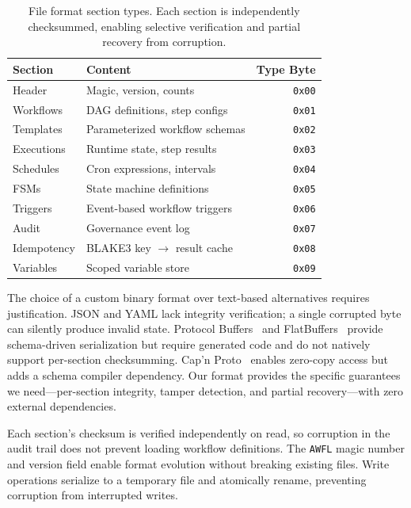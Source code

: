 \documentclass[10pt, twocolumn]{article}
\begin{document}
\begin{table}[t]
\caption{File format section types. Each section is independently checksummed, enabling selective verification and partial recovery from corruption.}
\label{tab:sections}
\centering\scriptsize
\begin{tabular}{@{}llr@{}}
\toprule
\textbf{Section} & \textbf{Content} & \textbf{Type Byte} \\
\midrule
Header      & Magic, version, counts        & \texttt{0x00} \\
Workflows   & DAG definitions, step configs  & \texttt{0x01} \\
Templates   & Parameterized workflow schemas & \texttt{0x02} \\
Executions  & Runtime state, step results    & \texttt{0x03} \\
Schedules   & Cron expressions, intervals    & \texttt{0x04} \\
FSMs        & State machine definitions      & \texttt{0x05} \\
Triggers    & Event-based workflow triggers   & \texttt{0x06} \\
Audit       & Governance event log           & \texttt{0x07} \\
Idempotency & BLAKE3 key $\to$ result cache  & \texttt{0x08} \\
Variables   & Scoped variable store          & \texttt{0x09} \\
\bottomrule
\end{tabular}
\end{table}

The choice of a custom binary format over text-based alternatives requires justification. JSON and YAML lack integrity verification; a single corrupted byte can silently produce invalid state. Protocol Buffers~\cite{protobuf2008} and FlatBuffers~\cite{flatbuffers2014} provide schema-driven serialization but require generated code and do not natively support per-section checksumming. Cap'n Proto~\cite{capnproto2013} enables zero-copy access but adds a schema compiler dependency. Our format provides the specific guarantees we need---per-section integrity, tamper detection, and partial recovery---with zero external dependencies.

Each section's checksum is verified independently on read, so corruption in the audit trail does not prevent loading workflow definitions. The \texttt{AWFL} magic number and version field enable format evolution without breaking existing files. Write operations serialize to a temporary file and atomically rename, preventing corruption from interrupted writes.
\end{document}
